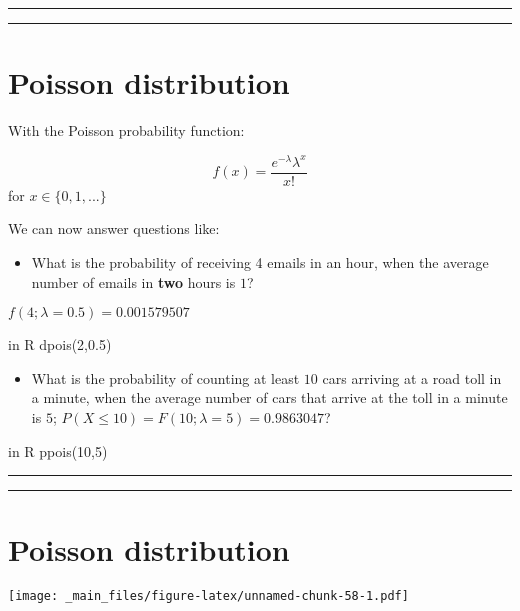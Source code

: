 \documentclass[
]{book}
\providecommand{\tightlist}{%
  \setlength{\itemsep}{0pt}\setlength{\parskip}{0pt}}
\begin{document}
\begin{center}\rule{0.5\linewidth}{0.5pt}\end{center}

\begin{center}\rule{0.5\linewidth}{0.5pt}\end{center}

\hypertarget{poisson-distribution-4}{%
\section{Poisson distribution}\label{poisson-distribution-4}}

With the Poisson probability function:

\[f(x)= \frac{e^{-\lambda}\lambda^x}{x!}\] for \(x \in \{0, 1, ...\}\)

We can now answer questions like:

\begin{itemize}
\tightlist
\item
  What is the probability of receiving 4 emails in an hour, when the average number of emails in \textbf{two} hours is \(1\)?
\end{itemize}

\(f(4; \lambda=0.5)=0.001579507\)

in R dpois(2,0.5)

\begin{itemize}
\tightlist
\item
  What is the probability of counting at least \(10\) cars arriving at a road toll in a minute, when the average number of cars that arrive at the toll in a minute is \(5\);
  \(P(X \leq 10)=F(10; \lambda=5)=0.9863047\)?
\end{itemize}

in R ppois(10,5)

\begin{center}\rule{0.5\linewidth}{0.5pt}\end{center}

\begin{center}\rule{0.5\linewidth}{0.5pt}\end{center}

\hypertarget{poisson-distribution-5}{%
\section{Poisson distribution}\label{poisson-distribution-5}}

\texttt{[image: \_main\_files/figure-latex/unnamed-chunk-58-1.pdf]}
\end{document}
